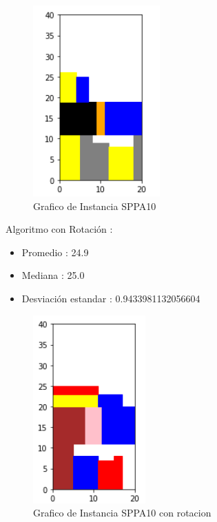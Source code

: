 \documentclass[10pt]{article}
\begin{document}
\begin{figure}[H]
\centerline{\includegraphics[width=0.5\linewidth]{3_sin_rotar.jpg}}
\caption{Grafico de Instancia SPPA10 }
\label{fig_5}
\end{figure} 


%
Algoritmo con Rotación : %
\begin{itemize}%
\item%
Promedio : 24.9%
\item%
Mediana : 25.0%
\item%
Desviación estandar : 0.9433981132056604%
\end{itemize}%

\begin{figure}[H]
\centerline{\includegraphics[width=0.5\linewidth]{3_con_rotar.jpg}}
\caption{Grafico de Instancia SPPA10 con rotacion}
\label{fig_6}
\end{figure} 
\end{document}
